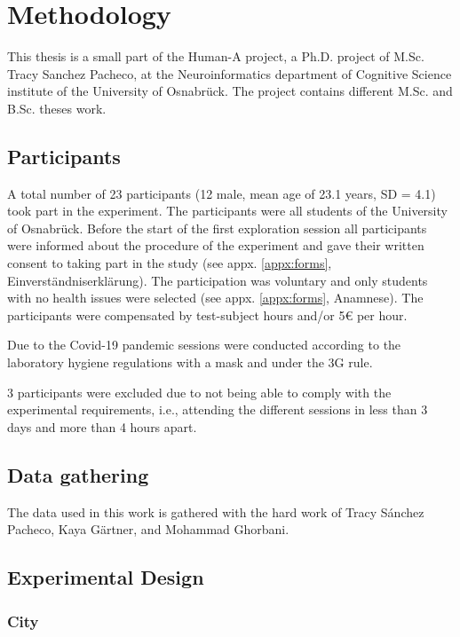 \chapter{Methodology}

This thesis is a small part of the Human-A project, a Ph.D. project of M.Sc. Tracy Sanchez Pacheco, at the Neuroinformatics department of Cognitive Science institute of the University of Osnabrück. The project contains different M.Sc. and B.Sc. theses work. 

\section{Participants}

A total number of 23 participants (12 male, mean age of 23.1 years, SD = 4.1) took part in the experiment. The participants were all students of the University of Osnabrück. Before the start of the first exploration session all participants were informed about the procedure of the experiment and gave their written consent to taking part in the study (see appx. \ref{appx:forms}, Einverständniserklärung). The participation was voluntary and only students with no health issues were selected (see appx. \ref{appx:forms}, Anamnese). The participants were compensated by test-subject hours and/or 5€ per hour.  

Due to the Covid-19 pandemic sessions were conducted according to the laboratory hygiene regulations with a mask and under the 3G rule.

3 participants were excluded due to not being able to comply with the experimental requirements, i.e., attending the different sessions in less than 3 days and more than 4 hours apart.

\section{Data gathering}
The data used in this work is gathered with the hard work of Tracy Sánchez Pacheco, Kaya Gärtner, and Mohammad Ghorbani.

\section{Experimental Design}

\subsection{City}

